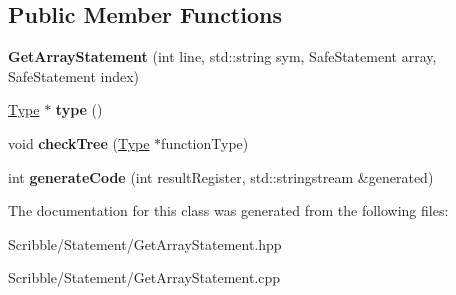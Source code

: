 \subsection*{Public Member Functions}
\begin{DoxyCompactItemize}
\item 
\hypertarget{class_get_array_statement_a4c74cbfd566d5618c3f3b25e2fb28645}{{\bfseries Get\-Array\-Statement} (int line, std\-::string sym, Safe\-Statement array, Safe\-Statement index)}\label{class_get_array_statement_a4c74cbfd566d5618c3f3b25e2fb28645}

\item 
\hypertarget{class_get_array_statement_ae35ba457621056e05dfc4fc03a44faa1}{\hyperlink{class_type}{Type} $\ast$ {\bfseries type} ()}\label{class_get_array_statement_ae35ba457621056e05dfc4fc03a44faa1}

\item 
\hypertarget{class_get_array_statement_af9a2bb2c371e47a13d044b7f25630380}{void {\bfseries check\-Tree} (\hyperlink{class_type}{Type} $\ast$function\-Type)}\label{class_get_array_statement_af9a2bb2c371e47a13d044b7f25630380}

\item 
\hypertarget{class_get_array_statement_acb03311335da7048d364042b38f8c679}{int {\bfseries generate\-Code} (int result\-Register, std\-::stringstream \&generated)}\label{class_get_array_statement_acb03311335da7048d364042b38f8c679}

\end{DoxyCompactItemize}


The documentation for this class was generated from the following files\-:\begin{DoxyCompactItemize}
\item 
Scribble/\-Statement/Get\-Array\-Statement.\-hpp\item 
Scribble/\-Statement/Get\-Array\-Statement.\-cpp\end{DoxyCompactItemize}
